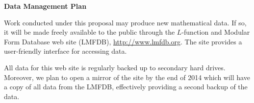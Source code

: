\documentclass[12pt]{article}
\begin{document}
\begin{center}
\textbf{\large  Data Management Plan}
\end{center}
\bigskip

Work conducted under this proposal may produce new mathematical data.
If so, it will be made freely available to the public through the
$L$-function and Modular Form Database web site (\textsf{LMFDB}),
\url{http://www.lmfdb.org}.  The site provides a user-friendly
interface for accessing data.

All data for this web site is regularly backed up to secondary hard
drives.  Moreover, we plan to open a mirror of the site by the end of
2014 which will have a copy of all data from the \textsf{LMFDB},
effectively providing a second backup of the data.
\end{document}
